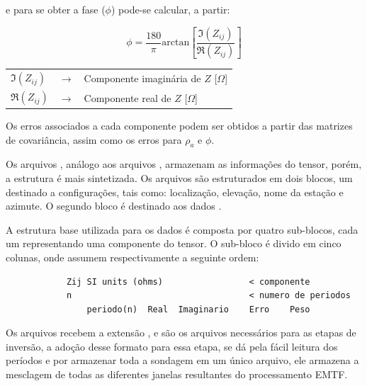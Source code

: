         \noindent e para se obter a fase ($\phi$) pode-se calcular, a partir:
        
        \begin{equation}
         \phi = \dfrac{180}{\pi} \textrm{arctan}\left [\dfrac{\Im(Z_{ij})}{\Re(Z_{ij})} \right ]
        \end{equation}

        {\footnotesize \noindent
            \begin{table}[H]
                \begin{tabular*}{1cm}{p{0.05cm}p{0.1cm}p{10cm}}
                    {\footnotesize $\Im(Z_{ij})$}  & {\footnotesize $\rightarrow$} & {\footnotesize Componente imaginária de $Z$ [$\Omega$]}\\
                    {\footnotesize $\Re(Z_{ij})$}  & {\footnotesize $\rightarrow$} & {\footnotesize Componente real de  $Z$ [$\Omega$]}\\
                \end{tabular*}
            \end{table}}
        
        Os erros associados a cada componente podem ser obtidos a partir das matrizes de covariância, assim como os erros para $\rho_a$ e $\phi$.
        
        Os arquivos , análogo aos arquivos , armazenam as informações do tensor, porém, a estrutura é mais sintetizada. Os arquivos são estruturados em dois blocos, um destinado a configurações, tais como: localização, elevação, nome da estação e azimute. O segundo bloco é destinado aos dados \cite{j-format}.
        
        A estrutura base utilizada para os dados é composta por quatro sub-blocos, cada um representando uma componente do tensor. O sub-bloco é divido em cinco colunas, onde assumem respectivamente a seguinte ordem: 
        
\begin{footnotesize}        
\begin{verbatim}
            Zij SI units (ohms)                 < componente
            n                                   < numero de periodos
                periodo(n)  Real  Imaginario    Erro    Peso
\end{verbatim}
\end{footnotesize}
               
        Os arquivos  recebem a extensão , e são os arquivos necessários para as etapas de inversão, a adoção desse formato para essa etapa, se dá pela fácil leitura dos períodos e por armazenar toda a sondagem em um único arquivo, ele armazena a mesclagem de todas as diferentes janelas resultantes do processamento EMTF.
        
